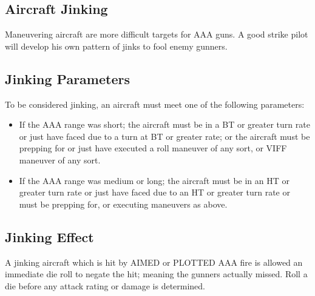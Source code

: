 \begin{advancedrules}

    \section{Aircraft Jinking}

    

    Maneuvering aircraft are more difficult targets for AAA guns. A good strike pilot will develop his own pattern of jinks to fool enemy gunners. 

    \subsection{Jinking Parameters} To be considered jinking, an aircraft must meet one of the following parameters:

    \begin{itemize}
        \item If the AAA range was short; the aircraft must be in a BT or greater turn rate or just have faced due to a turn at BT or greater rate; or the aircraft must be prepping for or just have executed a roll maneuver of any sort, or VIFF maneuver of any sort.

        \item If the AAA range was medium or long; the aircraft must be in an HT or greater turn rate or just have faced due to an HT or greater turn rate or must be prepping for, or executing maneuvers as above.
    \end{itemize}

     

    \subsection{Jinking Effect} A jinking aircraft which is hit by AIMED or PLOTTED AAA fire is allowed an immediate die roll to negate the hit; meaning the gunners actually missed. Roll a die before any attack rating or damage is determined.


\end{advancedrules}
